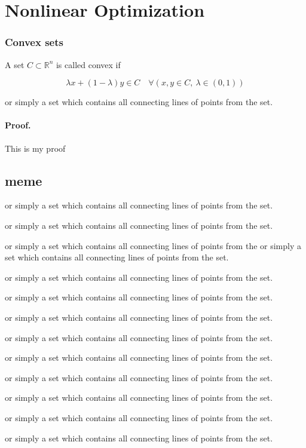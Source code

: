 \documentclass{article}
\def\R{\mathbb{R}}
\newenvironment{proof}{\paragraph{Proof.}}{}
\begin{document}
\section{Nonlinear Optimization}\label{d1c9db1}

\subsubsection{Convex sets}

A set $C\subset\R^n$ is called convex if

$$
	\lambda x  + (1-\lambda ) y \in C
	\quad
	\forall(x,y\in C,\ \lambda \in (0, 1))
$$

or simply a set which contains all connecting lines of points from the
set.

\begin{proof}
  This is my proof
\end{proof}

\subsection{meme}

or simply a set which contains all connecting lines of points from the
set.

or simply a set which contains all connecting lines of points from the
set.

or simply a set which contains all connecting lines of points from the
or simply a set which contains all connecting lines of points from the
set.

or simply a set which contains all connecting lines of points from the
set.

or simply a set which contains all connecting lines of points from the
set.

or simply a set which contains all connecting lines of points from the
set.

or simply a set which contains all connecting lines of points from the
set.

or simply a set which contains all connecting lines of points from the
set.

or simply a set which contains all connecting lines of points from the
set.

or simply a set which contains all connecting lines of points from the
set.

or simply a set which contains all connecting lines of points from the
set.

or simply a set which contains all connecting lines of points from the
set.
\end{document}
